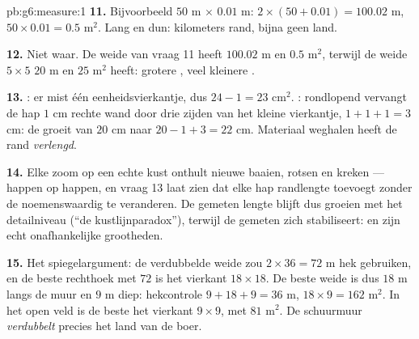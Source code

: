 \begin{solution}{pb:g6:measure:1}
\textbf{11.} Bijvoorbeeld $50$ m $\times$ $0.01$ m: 
$2 \times (50 + 0.01) = 100.02$ m,  $50 \times 0.01 = 0.5$ m$^2$. Lang
en dun: kilometers rand, bijna geen land.

\textbf{12.} Niet waar. De weide van vraag 11 heeft  $100.02$ m en
 $0.5$ m$^2$, terwijl de weide $5 \times 5$  $20$ m en
 $25$ m$^2$ heeft: grotere , veel kleinere .

\textbf{13.} : er mist één eenheidsvierkantje, dus $24 - 1 = 23$
cm$^2$. : rondlopend vervangt de hap $1$ cm rechte wand door drie zijden van
het kleine vierkantje, $1 + 1 + 1 = 3$ cm: de  groeit van $20$ cm naar
$20 - 1 + 3 = 22$ cm. Materiaal weghalen heeft de rand \emph{verlengd}.

\textbf{14.} Elke zoom op een echte kust onthult nieuwe baaien, rotsen en
kreken --- happen op happen, en vraag 13 laat zien dat elke hap randlengte
toevoegt zonder de  noemenswaardig te veranderen. De gemeten lengte
blijft dus groeien met het detailniveau (``de kustlijnparadox''), terwijl de
gemeten  zich stabiliseert:  en  zijn echt
onafhankelijke grootheden.

\textbf{15.} Het spiegelargument: de verdubbelde weide zou $2 \times 36 = 72$ m
hek gebruiken, en de beste rechthoek met  $72$ is het vierkant
$18 \times 18$. De beste weide is dus $18$ m langs de muur en $9$ m diep:
hekcontrole $9 + 18 + 9 = 36$ m,  $18 \times 9 = 162$ m$^2$. In het
open veld is de beste het vierkant $9 \times 9$, met  $81$ m$^2$. De
schuurmuur \emph{verdubbelt} precies het land van de boer.
\end{solution}
